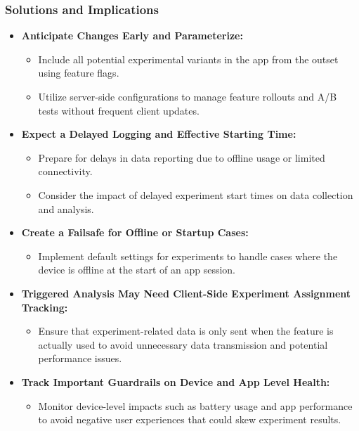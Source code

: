\documentclass{article}
\begin{document}
\subsubsection*{Solutions and Implications}
\begin{itemize}
    \item \textbf{Anticipate Changes Early and Parameterize:}
    \begin{itemize}
        \item Include all potential experimental variants in the app from the outset using feature flags.
        \item Utilize server-side configurations to manage feature rollouts and A/B tests without frequent client updates.
    \end{itemize}

    \item \textbf{Expect a Delayed Logging and Effective Starting Time:}
    \begin{itemize}
        \item Prepare for delays in data reporting due to offline usage or limited connectivity.
        \item Consider the impact of delayed experiment start times on data collection and analysis.
    \end{itemize}

    \item \textbf{Create a Failsafe for Offline or Startup Cases:}
    \begin{itemize}
        \item Implement default settings for experiments to handle cases where the device is offline at the start of an app session.
    \end{itemize}

    \item \textbf{Triggered Analysis May Need Client-Side Experiment Assignment Tracking:}
    \begin{itemize}
        \item Ensure that experiment-related data is only sent when the feature is actually used to avoid unnecessary data transmission and potential performance issues.
    \end{itemize}

    \item \textbf{Track Important Guardrails on Device and App Level Health:}
    \begin{itemize}
        \item Monitor device-level impacts such as battery usage and app performance to avoid negative user experiences that could skew experiment results.
    \end{itemize}


\end{itemize}
\end{document}
